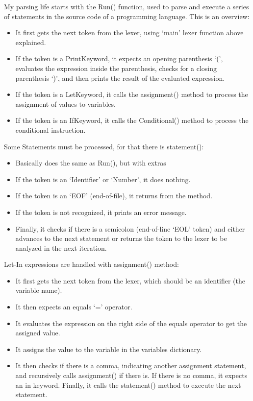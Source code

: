My parsing life starts with the Run{()} function, used to parse and execute a series of statements in the source code of a programming language. This is an overview:
\begin{itemize}
\item It first gets the next token from the lexer, using `main' lexer function above explained.
\item If the token is a PrintKeyword, it expects an opening parenthesis `(', evaluates the expression inside the parenthesis, checks for a closing parenthesis `)', and then prints the result of the evaluated expression.
\item If the token is a LetKeyword, it calls the assignment{()} method to process the assignment of values to variables.
\item If the token is an IfKeyword, it calls the Conditional{()} method to process the conditional instruction.
\end{itemize}
Some Statements must be processed, for that there is statement{()}:
\begin{itemize}
    \item Basically does the same as Run{()}, but with extras
    \item If the token is an `Identifier' or `Number', it does nothing.
    \item If the token is an `EOF' (end-of-file), it returns from the method.
    \item If the token is not recognized, it prints an error message.
    \item Finally, it checks if there is a semicolon (end-of-line `EOL' token) and either advances to the next statement or returns the token to the lexer to be analyzed in the next iteration.
\end{itemize}
Let-In expressions are handled with assignment{()} method:
\begin{itemize}
    \item It first gets the next token from the lexer, which should be an identifier (the variable name).
    \item It then expects an equals `=' operator.
    \item It evaluates the expression on the right side of the equals operator to get the assigned value.
    \item It assigns the value to the variable in the variables dictionary.
    \item It then checks if there is a comma, indicating another assignment statement, and recursively calls assignment{()} if there is.
If there is no comma, it expects an in keyword.
Finally, it calls the statement{()} method to execute the next statement.
\end{itemize}

